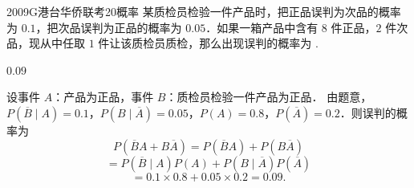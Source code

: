 
\begin{problem}{2009}{G}{港台华侨联考}{20}{概率}
某质检员检验一件产品时，把正品误判为次品的概率为 $ 0.1 $，把次品误判为正品的概率为 $ 0.05 $．如果一箱产品中含有 $ 8 $ 件正品，$ 2 $ 件次品，现从中任取 $ 1 $ 件让该质检员质检，那么出现误判的概率为 \underline{\hspace{4em}}.
\end{problem}

\begin{answer}
$ 0.09 $
\end{answer}

\begin{solutions}
设事件 $ A $：产品为正品，事件 $ B $：质检员检验一件产品为正品．  
由题意，$ P(\overline{B}\mid A)=0.1 $，$ P(B\mid \overline{A})=0.05 $，$ P(A)=0.8 $，$ P(\overline{A})=0.2 $．则误判的概率为  
$$
P(\overline{B}A + B\overline{A}) = P(\overline{B}A) + P(B\overline{A})
$$
$$
= P(\overline{B}\mid A)P(A) + P(B\mid \overline{A})P(\overline{A})
$$
$$
= 0.1 \times 0.8 + 0.05 \times 0.2 = 0.09.
$$
\end{solutions}